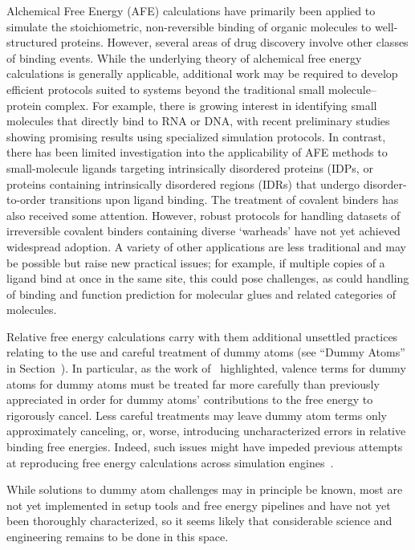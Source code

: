 \documentclass[9pt,bestpractices]{livecoms}
\begin{document}
Alchemical Free Energy (AFE) calculations have primarily been applied to simulate the stoichiometric, non-reversible binding of organic molecules to well-structured proteins. However, several areas of drug discovery involve other classes of binding events. While the underlying theory of alchemical free energy calculations is generally applicable, additional work may be required to develop efficient protocols suited to systems beyond the traditional small molecule–protein complex.
For example, there is growing interest in identifying small molecules that directly bind to RNA or DNA, with recent preliminary studies showing promising results using specialized simulation protocols.\cite{Abramyan2025,Rasouli2024} In contrast, there has been limited investigation into the applicability of AFE methods to small-molecule ligands targeting intrinsically disordered proteins (IDPs,\cite{Papadourakis2024} or proteins containing intrinsically disordered regions (IDRs) that undergo disorder-to-order transitions upon ligand binding.\cite{MendozaMartinez2022}
The treatment of covalent binders has also received some attention.\cite{luo2021,zhang2019} However, robust protocols for handling datasets of irreversible covalent binders containing diverse ‘warheads’ have not yet achieved widespread adoption.\cite{Yu2019} A variety of other applications are less traditional and may be possible but raise new practical issues; for example, if multiple copies of a ligand bind at once in the same site, this could pose challenges, as could handling of binding and function prediction for molecular glues and related categories of molecules. 

Relative free energy calculations carry with them additional unsettled practices relating to the use and careful treatment of dummy atoms (see ``Dummy Atoms'' in Section~\label{sec:relative-fe-protocol}). In particular, as the work of~\cite{Fleck_2021} highlighted, valence terms for dummy atoms for dummy atoms must be treated far more carefully than previously appreciated in order for dummy atoms' contributions to the free energy to rigorously cancel. Less careful treatments may leave dummy atom terms only approximately canceling, or, worse, introducing uncharacterized errors in relative binding free energies. Indeed, such issues might have impeded previous attempts at reproducing free energy calculations across simulation engines~\cite{loeffler2018reproducibility}. 

While solutions to dummy atom challenges may in principle be known, most are not yet implemented in setup tools and free energy pipelines and have not yet been thoroughly characterized, so it seems likely that considerable science and engineering remains to be done in this space. 
\end{document}
